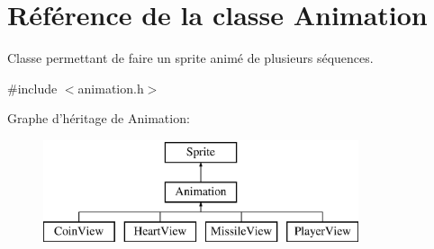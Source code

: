 \hypertarget{class_animation}{\section{Référence de la classe Animation}
\label{class_animation}
}


Classe permettant de faire un sprite animé de plusieurs séquences.  




{\ttfamily \#include $<$animation.\+h$>$}

Graphe d'héritage de Animation\+:\begin{figure}[H]
\begin{center}
\leavevmode
\includegraphics[height=3.000000cm]{class_animation}
\end{center}
\end{figure}
